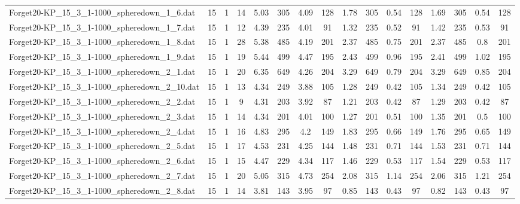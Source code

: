 \begin{sidewaystable}[!ht]
{\begin{tabular}{lccccccccccccccc}
Forget20-KP\_15\_3\_1-1000\_spheredown\_1\_6.dat & 15 & 1 & 14 & 5.03 & 305 & 4.09 & 128 & 1.78 & 305 &  \textcolor{blue2}{0.54} & 128 & 1.69 & 305 &  \textcolor{blue2}{0.54} & 128 \\
Forget20-KP\_15\_3\_1-1000\_spheredown\_1\_7.dat & 15 & 1 & 12 & 4.39 & 235 & 4.01 & 91 & 1.32 & 235 &  \textcolor{blue2}{0.52} & 91 & 1.42 & 235 & 0.53 & 91 \\
Forget20-KP\_15\_3\_1-1000\_spheredown\_1\_8.dat & 15 & 1 & 28 & 5.38 & 485 & 4.19 & 201 & 2.37 & 485 & 0.75 & 201 & 2.37 & 485 & 0.8 & 201 \\
Forget20-KP\_15\_3\_1-1000\_spheredown\_1\_9.dat & 15 & 1 & 19 & 5.44 & 499 & 4.47 & 195 & 2.43 & 499 &  \textcolor{blue2}{0.96} & 195 & 2.41 & 499 & 1.02 & 195 \\
Forget20-KP\_15\_3\_1-1000\_spheredown\_2\_1.dat & 15 & 1 & 20 & 6.35 & 649 & 4.26 & 204 & 3.29 & 649 &  \textcolor{blue2}{0.79} & 204 & 3.29 & 649 & 0.85 & 204 \\
Forget20-KP\_15\_3\_1-1000\_spheredown\_2\_10.dat & 15 & 1 & 13 & 4.34 & 249 & 3.88 & 105 & 1.28 & 249 &  \textcolor{blue2}{0.42} & 105 & 1.34 & 249 &  \textcolor{blue2}{0.42} & 105 \\
Forget20-KP\_15\_3\_1-1000\_spheredown\_2\_2.dat & 15 & 1 & 9 & 4.31 & 203 & 3.92 & 87 & 1.21 & 203 &  \textcolor{blue2}{0.42} & 87 & 1.29 & 203 &  \textcolor{blue2}{0.42} & 87 \\
Forget20-KP\_15\_3\_1-1000\_spheredown\_2\_3.dat & 15 & 1 & 14 & 4.34 & 201 & 4.01 & 100 & 1.27 & 201 & 0.51 & 100 & 1.35 & 201 &  \textcolor{blue2}{0.5} & 100 \\
Forget20-KP\_15\_3\_1-1000\_spheredown\_2\_4.dat & 15 & 1 & 16 & 4.83 & 295 & 4.2 & 149 & 1.83 & 295 & 0.66 & 149 & 1.76 & 295 &  \textcolor{blue2}{0.65} & 149 \\
Forget20-KP\_15\_3\_1-1000\_spheredown\_2\_5.dat & 15 & 1 & 17 & 4.53 & 231 & 4.25 & 144 & 1.48 & 231 &  \textcolor{blue2}{0.71} & 144 & 1.53 & 231 &  \textcolor{blue2}{0.71} & 144 \\
Forget20-KP\_15\_3\_1-1000\_spheredown\_2\_6.dat & 15 & 1 & 15 & 4.47 & 229 & 4.34 & 117 & 1.46 & 229 &  \textcolor{blue2}{0.53} & 117 & 1.54 & 229 &  \textcolor{blue2}{0.53} & 117 \\
Forget20-KP\_15\_3\_1-1000\_spheredown\_2\_7.dat & 15 & 1 & 20 & 5.05 & 315 & 4.73 & 254 & 2.08 & 315 & 1.14 & 254 & 2.06 & 315 & 1.21 & 254 \\
Forget20-KP\_15\_3\_1-1000\_spheredown\_2\_8.dat & 15 & 1 & 14 & 3.81 & 143 & 3.95 & 97 & 0.85 & 143 &  \textcolor{blue2}{0.43} & 97 & 0.82 & 143 &  \textcolor{blue2}{0.43} & 97 \\

\end{tabular}}
\end{sidewaystable}
